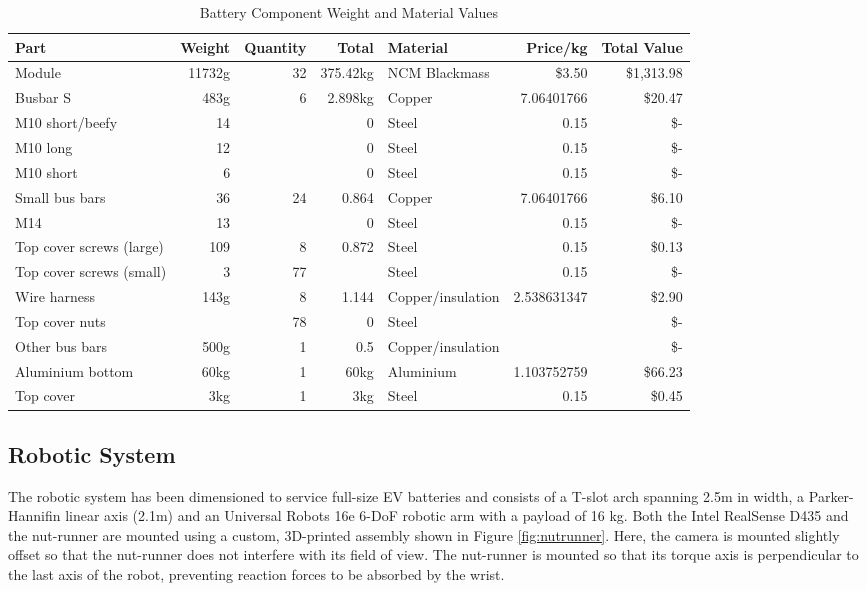 \documentclass[letterpaper, 10 pt, conference]{ieeeconf}  %
\begin{document}
\begin{table}[!htb]
\caption{Battery Component Weight and Material Values\label{tab:materials}}
\begin{center}
\begin{tabular}{|l|r|r|r|l|r|r|}
\hline
Part & Weight & Quantity & Total & Material & Price/kg & Total Value \\
\hline
Module & 11732g & 32 & 375.42kg & NCM Blackmass & \$3.50 & \$1,313.98 \\
Busbar S & 483g & 6 & 2.898kg & Copper & 7.06401766 & \$20.47 \\
M10 short/beefy & 14 &  & 0 & Steel & 0.15 & \$- \\
M10 long & 12 &  & 0 & Steel & 0.15 & \$- \\
M10 short & 6 &  & 0 & Steel & 0.15 & \$- \\
Small bus bars & 36 & 24 & 0.864 & Copper & 7.06401766 & \$6.10 \\
M14 & 13 &  & 0 & Steel & 0.15 & \$- \\
Top cover screws (large) & 109 & 8 & 0.872 & Steel & 0.15 & \$0.13 \\
Top cover screws (small) & 3 &  77 &   & Steel & 0.15 & \$- \\
Wire harness & 143g & 8 & 1.144 & Copper/insulation & 2.538631347 & \$2.90 \\
Top cover nuts &  & 78 & 0 & Steel &  & \$- \\
Other bus bars & 500g & 1 & 0.5 & Copper/insulation &  & \$- \\
Aluminium bottom & 60kg & 1 & 60kg & Aluminium & 1.103752759 & \$66.23 \\
Top cover & 3kg & 1 & 3kg & Steel & 0.15 & \$0.45 \\
\hline
\end{tabular}
\end{center}
\end{table}

\subsection{Robotic System}
The robotic system has been dimensioned to service full-size EV batteries and consists of a T-slot arch spanning 2.5m in width, a Parker-Hannifin linear axis (2.1m) and an Universal Robots 16e 6-DoF robotic arm with a payload of 16 kg.  Both the  Intel RealSense D435 and the nut-runner are mounted using a custom, 3D-printed assembly shown in Figure \ref{fig:nutrunner}. Here, the camera is mounted slightly offset so that the nut-runner does not interfere with its field of view. The nut-runner is mounted so that its torque axis is perpendicular to the last axis of the robot, preventing reaction forces to be absorbed by the wrist. 
\end{document}
